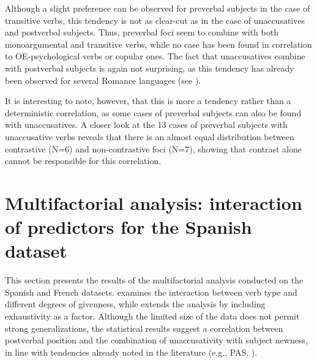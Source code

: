 \begin{table}
\caption{Spanish subject position by argument structure}
\label{tab:6.4}
\end{table}



Although a slight preference can be observed for preverbal subjects in the case of transitive verbs, this tendency is not as clear-cut as in the case of unaccusatives and postverbal subjects. Thus, preverbal foci seem to combine with both monoargumental and transitive verbs, while no case has been found in correlation to OE-psychological verbs or copular ones. 
The fact that unaccusatives combine with postverbal subjects is again not surprising, as this tendency has already been observed for several Romance languages (see ). 

It is interesting to note, however, that this is more a tendency rather than a deterministic correlation, as some cases of preverbal subjects can also be found with unaccusatives. A closer look at the 13 cases of preverbal subjects with unaccusative verbs reveals that there is an almost equal distribution between contrastive (N=6) and non-contrastive foci (N=7), showing that contrast alone cannot be responsible for this correlation.

\section{Multifactorial analysis: interaction of predictors for the Spanish dataset} \label{sub:6.7}

This section presents the results of the multifactorial analysis conducted on the Spanish and French datasets.  examines the interaction between verb type and different degrees of givenness, while  extends the analysis by including exhaustivity as a factor. Although the limited size of the data does not permit strong generalizations, the statistical results suggest a correlation between postverbal position and the combination of unaccusativity with subject newness, in line with tendencies already noted in the literature (e.g., PAS, \cite{du2003preferred}). 

